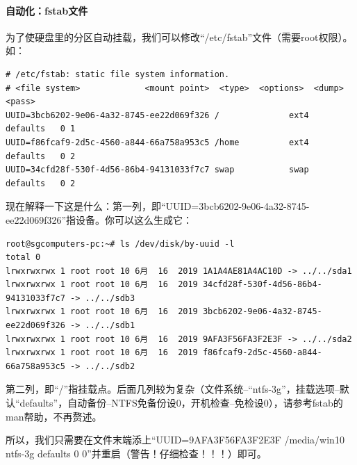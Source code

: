 \paragraph{自动化：fstab文件}
为了使硬盘里的分区自动挂载，我们可以修改“/etc/fstab”文件（需要root权限）。如：
\begin{verbatim}
# /etc/fstab: static file system information.
# <file system>             <mount point>  <type>  <options>  <dump>  <pass>
UUID=3bcb6202-9e06-4a32-8745-ee22d069f326 /              ext4    defaults   0 1
UUID=f86fcaf9-2d5c-4560-a844-66a758a953c5 /home          ext4    defaults   0 2
UUID=34cfd28f-530f-4d56-86b4-94131033f7c7 swap           swap    defaults   0 2
\end{verbatim} \par
现在解释一下这是什么：第一列，即“UUID=3bcb6202-9e06-4a32-8745-ee22d069f326”指设备。你可以这么生成它：
\begin{verbatim}
root@sgcomputers-pc:~# ls /dev/disk/by-uuid -l
total 0
lrwxrwxrwx 1 root root 10 6月  16  2019 1A1A4AE81A4AC10D -> ../../sda1
lrwxrwxrwx 1 root root 10 6月  16  2019 34cfd28f-530f-4d56-86b4-94131033f7c7 -> ../../sdb3
lrwxrwxrwx 1 root root 10 6月  16  2019 3bcb6202-9e06-4a32-8745-ee22d069f326 -> ../../sdb1
lrwxrwxrwx 1 root root 10 6月  16  2019 9AFA3F56FA3F2E3F -> ../../sda2
lrwxrwxrwx 1 root root 10 6月  16  2019 f86fcaf9-2d5c-4560-a844-66a758a953c5 -> ../../sdb2
\end{verbatim} \par
第二列，即“/”指挂载点。后面几列较为复杂（文件系统--“ntfs-3g”，挂载选项--默认“defaults”，自动备份--NTFS免备份设0，开机检查--免检设0），请参考fstab的man帮助，不再赘述。\par
所以，我们只需要在文件末端添上“UUID=9AFA3F56FA3F2E3F  /media/win10 ntfs-3g defaults   0 0”并重启（警告！仔细检查！！！）即可。
